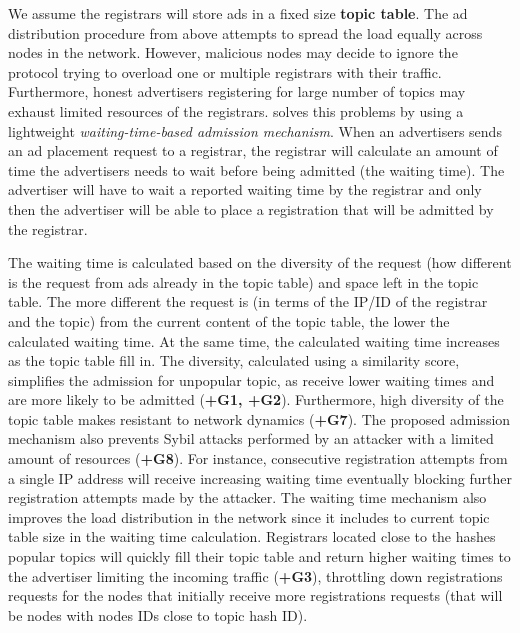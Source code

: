  
  We assume the registrars will store ads in a fixed size \textbf{topic table}. The ad distribution procedure from above attempts to spread the load equally across nodes in the network. 
However, malicious nodes may decide to ignore the protocol trying to overload one or multiple registrars with their traffic. 
Furthermore,  honest advertisers registering for large number of topics may exhaust limited resources of the registrars. 
 \sysname solves this problems by using a lightweight \textit{waiting-time-based admission mechanism}. When an advertisers sends an ad placement request to a registrar, the registrar will calculate an amount of time the advertisers needs to wait before being admitted (\ie the waiting time). 
The advertiser will have to wait a reported waiting time by the registrar and only then the advertiser will be able to place a registration that will be admitted by the registrar.
 
The waiting time is calculated based on the diversity of the request (\ie how different is the request from ads already in the topic table) and space left in the topic table. 
The more different the request is (in terms of the IP/ID of the registrar and the topic) from the current content of the topic table, the lower the calculated waiting time. 
At the same time,  the calculated waiting time increases as the topic table fill in. 
The diversity,  calculated using a similarity score,  simplifies the admission for unpopular topic, as receive lower waiting times and are more likely to be admitted (\textbf{+G1, +G2}).
Furthermore,  high diversity of the topic table makes \sysname resistant to network dynamics (\textbf{+G7}). The proposed admission mechanism also prevents Sybil attacks performed by an attacker with a limited amount of resources (\textbf{+G8}). 
For instance, consecutive registration attempts from a single IP address will receive increasing waiting time eventually blocking further registration attempts made by the attacker. 
The waiting time mechanism also improves the load distribution in the network since it includes to current topic table size in the waiting time calculation.
Registrars located close to the hashes popular topics will quickly fill their topic table and return higher waiting times to the advertiser limiting the incoming traffic (\textbf{+G3}),  throttling down registrations requests for the nodes that initially receive more registrations requests (that will be nodes with nodes IDs close to topic hash ID).


